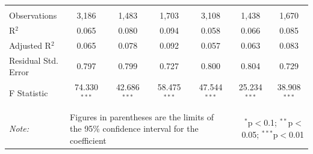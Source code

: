\documentclass[alpha-refs]{wiley-article-01g}
\begin{document}
\begin{landscape}
\begin{table}[!htbp]
\begin{tabular}{@{\extracolsep{5pt}}lcccccc}
  & & & & & & \\ 
\hline \\[-3ex] 
Observations & 3,186 & 1,483 & 1,703 & 3,108 & 1,438 & 1,670 \\ 
R$^{2}$ & 0.065 & 0.080 & 0.094 & 0.058 & 0.066 & 0.085 \\ 
Adjusted R$^{2}$ & 0.065 & 0.078 & 0.092 & 0.057 & 0.063 & 0.083 \\ 
Residual Std. Error & 0.797 & 0.799 & 0.727 & 0.800 & 0.804 & 0.729 \\ 
F Statistic & 74.330$^{***}$ & 42.686$^{***}$ & 58.475$^{***}$ & 47.544$^{***}$ & 25.234$^{***}$ & 38.908$^{***}$ \\ 
\hline 
\hline \\[-3ex] 
\textit{Note:} &\multicolumn{4}{l}{Figures in parentheses are the limits of the 95\% confidence interval for the coefficient}  & \multicolumn{2}{r}{$^{*}$p$<$0.1; $^{**}$p$<$0.05; $^{***}$p$<$0.01} \\ 
\end{tabular} 
\end{table} 

\end{landscape}

\newpage
\end{document}
